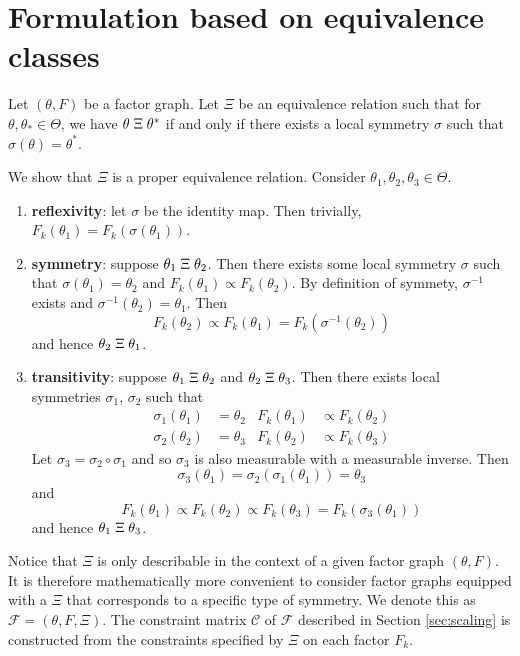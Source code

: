 

\section{Formulation based on equivalence classes}

Let $(\theta,F)$ be a factor graph. Let $\Xi$ be an equivalence relation such that for $\theta,\theta_*\in\Theta$, we have $\theta\;\Xi\;\theta^*$ if and only if there exists a local symmetry $\sigma$ such that $\sigma(\theta)=\theta^*$.

We show that $\Xi$ is a proper equivalence relation. Consider $\theta_1, \theta_2, \theta_3\in\Theta$.
\begin{enumerate}

\item
\textbf{reflexivity}: let $\sigma$ be the identity map. Then trivially, $F_k(\theta_1) = F_k(\sigma(\theta_1))$.

\item
\textbf{symmetry}: suppose $\theta_1\;\Xi\;\theta_2$. Then there exists some local symmetry $\sigma$ such that $\sigma(\theta_1)=\theta_2$ and $F_k(\theta_1) \propto F_k(\theta_2)$. By definition of symmety, $\sigma^{-1}$ exists and $\sigma^{-1}(\theta_2)=\theta_1$. Then
\[
F_k(\theta_2) \propto F_k(\theta_1) = F_k(\sigma^{-1}(\theta_2))
\]
and hence $\theta_2\;\Xi\;\theta_1$.

\item
\textbf{transitivity}: suppose $\theta_1\;\Xi\;\theta_2$ and $\theta_2\;\Xi\;\theta_3$. Then there exists local symmetries $\sigma_1$, $\sigma_2$ such that
\begin{align*}
\sigma_1(\theta_1)&=\theta_2 & F_k(\theta_1)&\propto F_k(\theta_2) \\
\sigma_2(\theta_2)&=\theta_3 & F_k(\theta_2)&\propto F_k(\theta_3)
\end{align*}
Let $\sigma_3=\sigma_2\circ\sigma_1$ and so $\sigma_3$ is also measurable with a measurable inverse. Then
\[
\sigma_3(\theta_1)=\sigma_2(\sigma_1(\theta_1)) = \theta_3
\]
and
\[
F_k(\theta_1) \propto F_k(\theta_2) \propto F_k(\theta_3) = F_k(\sigma_3(\theta_1))
\]
and hence $\theta_1\;\Xi\;\theta_3$.

\end{enumerate}

Notice that $\Xi$ is only describable in the context of a given factor graph $(\theta,F)$. It is therefore mathematically more convenient to consider factor graphs equipped with a $\Xi$ that corresponds to a specific type of symmetry. We denote this as $\mathcal{F}=(\theta,F,\Xi)$. The constraint matrix $\mathcal{C}$ of $\mathcal{F}$ described in Section \ref{sec:scaling} is constructed from the constraints specified by $\Xi$ on each factor $F_k$.

